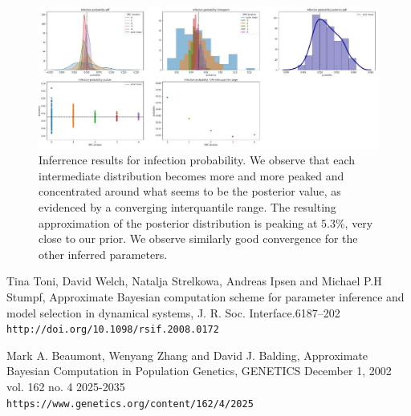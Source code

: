 \documentclass[11pt]{article}
\begin{document}
\begin{figure}
  \includegraphics[width=\linewidth, scale=1]{images/inferred_infection_probability.jpg}
  \caption{Inferrence results for infection probability. We observe that each intermediate distribution becomes more and more peaked and concentrated around what seems to be the posterior value, as evidenced by a converging interquantile range. The resulting approximation of the posterior distribution is peaking at $5.3\%$, very close to our prior. We observe similarly good convergence for the other inferred parameters.}
  \label{fig:inferred_infection_probability}
\end{figure}

\begin{thebibliography}{9}
Tina Toni, David Welch, Natalja Strelkowa, Andreas Ipsen and Michael P.H Stumpf, Approximate Bayesian computation scheme for parameter inference and model selection in dynamical systems, J. R. Soc. Interface.6187–202
\\\texttt{http://doi.org/10.1098/rsif.2008.0172}

Mark A. Beaumont, Wenyang Zhang and David J. Balding, Approximate Bayesian Computation in Population Genetics, GENETICS December 1, 2002 vol. 162 no. 4 2025-2035 \\\texttt{https://www.genetics.org/content/162/4/2025}
\end{thebibliography}
\end{document}
